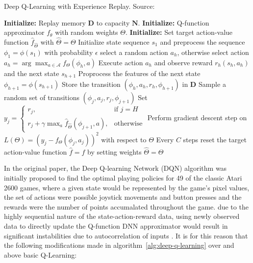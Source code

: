\documentclass{mldsmsc}
\begin{document}
\begin{algorithm}
    \caption{Deep Q-Learning with Experience Replay. Source: \citep{RefWorks:mnih2015human-level}}
    \label{alg:deep-q-learning}
    \begin{algorithmic}[1]
        \State \textbf{Initialize:} Replay memory $\mathbf{D}$ to capacity $\mathbf{N}$.
        \State \textbf{Initialize:} Q-function approximator $f_{\theta}$ with random weights $\Theta$.
        \State \textbf{Initialize:} Set target action-value function $\hat{f}_{\hat{\Theta}}$ with $\hat{\Theta} = \Theta$
            \State Initialize state sequence $s_1$ and preprocess the sequence $\phi_1 = \phi(s_1)$
                \State with probability $\epsilon$ select a random action $a_h$,
                otherwise select action $a_h = \arg\max_{a \in \mathcal{A}} f_{\Theta}(\phi_h, a)$
                \State Execute action $a_h$ and observe reward $r_h(s_h, a_h)$ and the next state $s_{h+1}$
                \State Proprocess the features of the next state $\phi_{h+1} = \phi(s_{h+1})$
                \State Store the transition $(\phi_{h}, a_h, r_h, \phi_{h+1})$ in $\mathbf{D}$
                \State Sample a random set of transitions $(\phi_{j}, a_j, r_j, \phi_{j+1})$
                \State \label{dqn-target} Set $y_j = \begin{cases} r_j, & \text{if } j=H\\ r_j + \gamma \max_{a} \hat{f}_{\hat{\Theta}}(\phi_{j+1},a), & \text{otherwise} \end{cases}$
                \State Perform gradient descent step on $L(\Theta) = \left(y_j - f_{\Theta}(\phi_j,a_j)\right)^2$ with respect to $\Theta$
                \State Every $C$ steps reset the target action-value function $\hat{f} = f$ by setting weights $\hat{\Theta} = \Theta$
            \EndFor
        \EndFor
    \end{algorithmic}
\end{algorithm}

In the original paper, the Deep Q-learning Network (DQN) algorithm was initially proposed to find the optimal
playing policies for 49 of the classic Atari 2600 games, where a given state would be represented by the game's
pixel values, the set of actions were possible joystick movements and button presses and the rewards were the number
of points accumalated throughout the game. \cite{RefWorks:mnih2015human-level} due to the highly sequential nature of
the state-action-reward data, using newly observed data to directly update the Q-function DNN approximator
would result in significant instabilities due to autocorrelation of inputs \citep{RefWorks:mnih2015human-level}.
It is for this reason that the following modifications made in algorithm~\ref{alg:deep-q-learning} over and above
basic Q-Learning:
\end{document}
